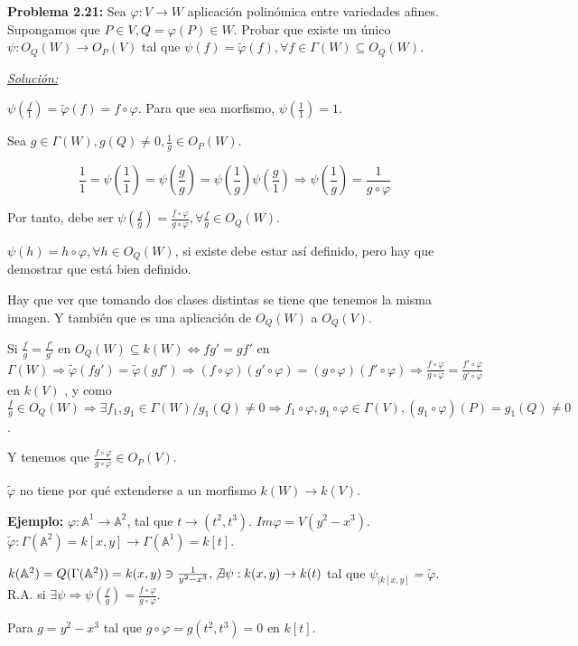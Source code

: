 \textbf{Problema 2.21: } Sea $\varphi:V\rightarrow W$ aplicación polinómica entre variedades afines. Supongamos que $P\in V, Q=\varphi(P)\in W$. Probar que existe un único $\psi: O_Q(W)\rightarrow O_P(V)$ tal que $\psi(f)=\tilde{\varphi}(f), \forall f \in \Gamma(W)\subseteq O_Q(W)$. 

\underline{\textit{Solución: }}

$\psi(\frac{f}{1})=\tilde{\varphi}(f)=f\circ \varphi$.  Para que sea morfismo, $\psi(\frac{1}{1})=1$. 

Sea $g\in \Gamma(W), g(Q)\neq 0, \frac{1}{g} \in O_P(W)$.

$$\frac{1}{1}=\psi(\frac{1}{1})=\psi(\frac{g}{g})=\psi(\frac{1}{g})\psi(\frac{g}{1}) \Rightarrow \psi(\frac{1}{g})=\frac{1}{g\circ \varphi}$$

Por tanto, debe ser $\psi(\frac{f}{g})=\frac{f\circ \varphi}{g\circ \varphi}, \forall \frac{f}{g}\in O_Q(W)$.

$\psi(h)=h\circ \varphi, \forall h\in O_Q(W)$, si existe debe estar así definido, pero hay que demostrar que está bien definido. 

Hay que ver que tomando dos clases distintas se tiene que tenemos la misma imagen. Y también que es una aplicación de $O_Q(W)$ a $O_Q(V)$.

Si $\frac{f}{g}=\frac{f'}{g'}$ en $O_Q(W)\subseteq k(W) \Leftrightarrow fg'=gf'$ en $\Gamma(W) \Rightarrow \tilde{\varphi}(fg')=\tilde{\varphi}(gf')\Rightarrow (f\circ \varphi)(g'\circ \varphi)= (g\circ \varphi)(f'\circ \varphi) \Rightarrow \frac{f\circ \varphi}{g\circ \varphi}= \frac{f'\circ \varphi}{g'\circ \varphi}$ en $k(V)$ , y como $\frac{f}{g}\in O_Q(W) \Rightarrow \exists f_1,g_1\in \Gamma(W)/g_1(Q)\neq 0 \Rightarrow f_1\circ \varphi, g_1\circ \varphi \in \Gamma(V), (g_1\circ \varphi)(P)=g_1(Q)\neq 0$.

Y tenemos que $\frac{f\circ \varphi}{g\circ \varphi}\in O_P(V)$.

\begin{nota}
$\tilde{\varphi}$ no tiene por qué extenderse a un morfismo $k(W)\rightarrow k(V)$. 

\textbf{Ejemplo:} $\varphi:\mathbb{A}^1\rightarrow \mathbb{A}^2$, tal que $t\rightarrow (t^2,t^3)$. $Im\varphi=V(y^2-x^3)$. $\tilde{\varphi}:\Gamma(\mathbb{A}^2)=k[x,y]\rightarrow \Gamma(\mathbb{A}^1)=k[t]$. 

$k(\mathbb{A}^2)=Q(\Gamma(\mathbb{A}^2))=k(x,y) \ni \frac{1}{y^2-x^3}, \not \exists \psi: k(x,y)\rightarrow k(t)$ tal que $\psi_{|k[x,y]}=\tilde{\varphi}$. R.A. si $\exists \psi \Rightarrow \psi(\frac{f}{g})=\frac{f\circ \varphi}{g\circ \varphi}$. 

Para $g=y^2-x^3 $ tal que $g\circ \varphi = g(t^2,t^3)=0$ en $k [t]$. 
\end{nota}

